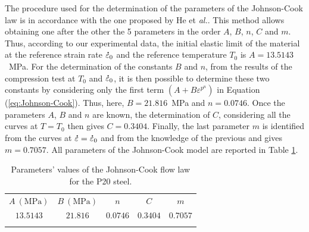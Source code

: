 \documentclass[twoside,english,1p,final,sort&compress]{elsarticle}
\makeatletter
\theoremstyle{plain}
\DeclareRobustCommand{\mdot}[1]{\accentset{\mbox{\bfseries .}}{#1}}
\DeclareRobustCommand{\eal}{et \emph{al.}\@\xspace}
\makeatother
\begin{document}
The procedure used for the determination of the parameters of the Johnson-Cook law is in accordance with the one proposed by He \eal \cite{He-2013}.
This method allows obtaining one after the other the 5 parameters in the order $A$, $B$, $n$, $C$ and $m$.
Thus, according to our experimental data, the initial elastic limit of the material at the reference strain rate $\mdot\varepsilon_0$ and the reference temperature $T_0$ is $A=13.5143$~MPa.
For the determination of the constants $B$ and $n$, from the results of the compression test at $T_0$ and $\mdot\varepsilon_0$, it is then possible to determine these two constants by considering only the first term $\left(A+B\varepsilon^{p^{n}}\right)$ in Equation (\ref{eq:Johnson-Cook}).
Thus, here, $B=21.816$~MPa and $n=0.0746$.
Once the parameters $A$, $B$ and $n$ are known, the determination of $C$, considering all the curves at $T=T_0$ then gives $C=0.3404$.
Finally, the last parameter $m$ is identified from the curves at $\mdot\varepsilon=\mdot\varepsilon_0$ and from the knowledge of the previous and gives $m=0.7057$.
All parameters of the Johnson-Cook model are reported in Table \ref{tab:JC}.

\begin{table}[h!]
\centering
\caption{Parameters' values of the Johnson-Cook flow law for the P20 steel.}
\begin{tabular}{ccccc}
\hline
$A~(\text{MPa})$ & $B~(\text{MPa})$ & $n$ & $C$ & $m$\\
$13.5143$&$21.816$&$0.0746$&$0.3404$&$0.7057$\\\hline
\label{tab:JC}
\end{tabular}
\end{table}
\end{document}
